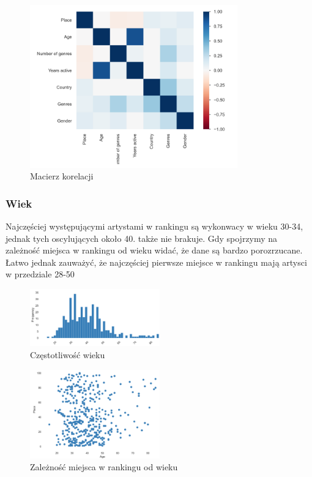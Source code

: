\documentclass[12pt, letterpaper]{article}
\begin{document}
\begin{figure}[h]
    \centering
    \includegraphics[width=0.8\textwidth]{correlation_matrix}  
    \caption{Macierz korelacji}
\end{figure}

\subsubsection{Wiek}

Najczęściej występującymi artystami w rankingu są wykonwacy w wieku 30-34, jednak tych oscylujących około 40. także nie brakuje. Gdy spojrzymy na zależność miejsca w rankingu od wieku widać, że dane są bardzo porozrzucane. Łatwo jednak zauważyć, że najczęściej pierwsze miejsce w rankingu mają artysci w przedziale 28-50

\begin{figure}[h]
    \centering
    \includegraphics[width=0.5\textwidth]{age_frequency}  
    \caption{Częstotliwość wieku}
\end{figure}

\begin{figure}[h!]
    \centering
    \includegraphics[width=0.5\textwidth]{place_age}  
    \caption{Zależność miejsca w rankingu od wieku}
\end{figure}
\end{document}
